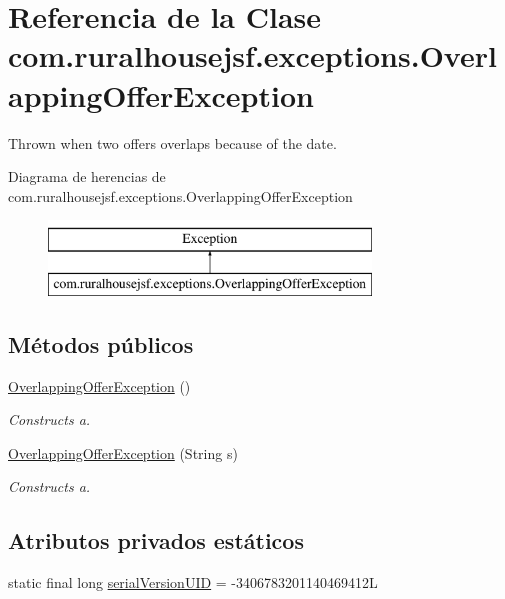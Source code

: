 \hypertarget{a00212}{}\section{Referencia de la Clase com.\+ruralhousejsf.\+exceptions.\+Overlapping\+Offer\+Exception}
\label{a00212}


Thrown when two offers overlaps because of the date.  


Diagrama de herencias de com.\+ruralhousejsf.\+exceptions.\+Overlapping\+Offer\+Exception\begin{figure}[H]
\begin{center}
\leavevmode
\includegraphics[height=2.000000cm]{a00212}
\end{center}
\end{figure}
\subsection*{Métodos públicos}
\begin{DoxyCompactItemize}
\item 
\mbox{\hyperlink{a00212_a2386ba3955f5299aeb00c053d4f831fb}{Overlapping\+Offer\+Exception}} ()
\begin{DoxyCompactList}\small\item\em Constructs a. \end{DoxyCompactList}\item 
\mbox{\hyperlink{a00212_a7961de1dd207f4d451ba28b8b343a283}{Overlapping\+Offer\+Exception}} (String s)
\begin{DoxyCompactList}\small\item\em Constructs a. \end{DoxyCompactList}\end{DoxyCompactItemize}
\subsection*{Atributos privados estáticos}
\begin{DoxyCompactItemize}
\item 
static final long \mbox{\hyperlink{a00212_aaff379d27ee36188b92cd4ed2ee2010e}{serial\+Version\+U\+ID}} = -\/3406783201140469412L
\end{DoxyCompactItemize}


